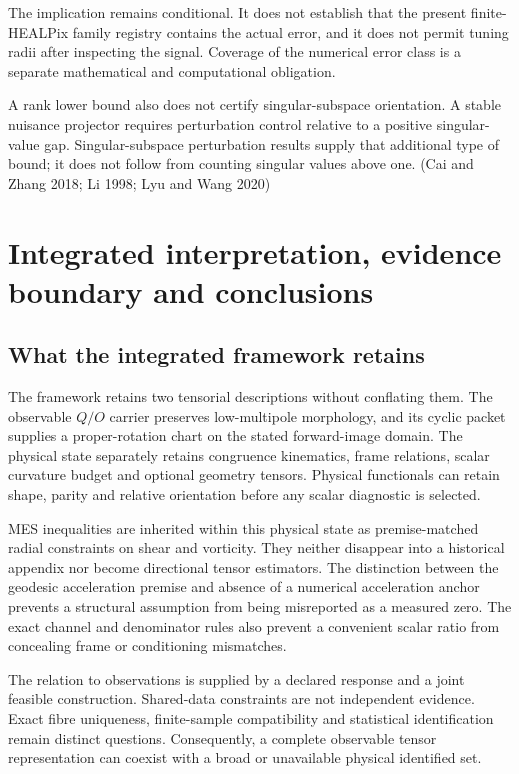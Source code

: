 \documentclass[
  11pt,
  a4paper]{article}
\begin{document}
The implication remains conditional. It does not establish that the present
finite-HEALPix family registry contains the actual error, and it does not
permit tuning radii after inspecting the signal. Coverage of the numerical
error class is a separate mathematical and computational obligation.

A rank lower bound also does not certify singular-subspace orientation. A
stable nuisance projector requires perturbation control relative to a positive
singular-value gap. Singular-subspace perturbation results supply that
additional type of bound; it does not follow from counting singular values
above one. (Cai and Zhang 2018; Li 1998; Lyu and Wang 2020)

\hypertarget{integrated-interpretation-evidence-boundary-and-conclusions}{%
\section{Integrated interpretation, evidence boundary and conclusions}\label{integrated-interpretation-evidence-boundary-and-conclusions}}

\hypertarget{what-the-integrated-framework-retains}{%
\subsection{What the integrated framework retains}\label{what-the-integrated-framework-retains}}

The framework retains two tensorial descriptions without conflating them. The observable \(Q/O\) carrier preserves low-multipole morphology, and its cyclic packet supplies a proper-rotation chart on the stated forward-image domain. The physical state separately retains congruence kinematics, frame relations, scalar curvature budget and optional geometry tensors. Physical functionals can retain shape, parity and relative orientation before any scalar diagnostic is selected.

MES inequalities are inherited within this physical state as premise-matched radial constraints on shear and vorticity. They neither disappear into a historical appendix nor become directional tensor estimators. The distinction between the geodesic acceleration premise and absence of a numerical acceleration anchor prevents a structural assumption from being misreported as a measured zero. The exact channel and denominator rules also prevent a convenient scalar ratio from concealing frame or conditioning mismatches.

The relation to observations is supplied by a declared response and a joint feasible construction. Shared-data constraints are not independent evidence. Exact fibre uniqueness, finite-sample compatibility and statistical identification remain distinct questions. Consequently, a complete observable tensor representation can coexist with a broad or unavailable physical identified set.
\end{document}
